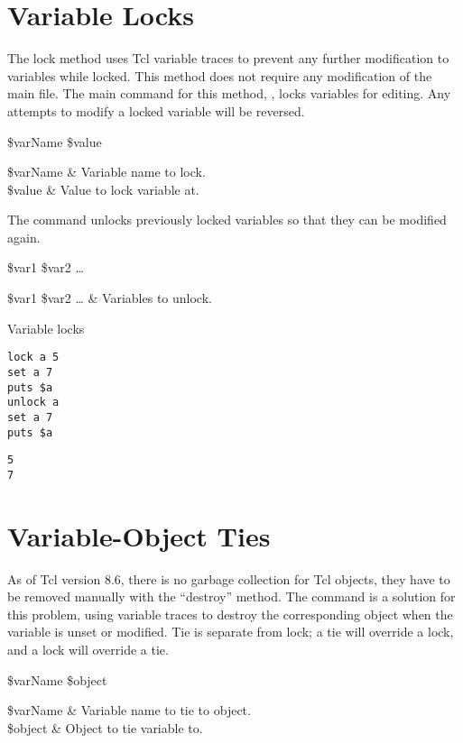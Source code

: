 \documentclass{article}
\renewcommand{\^}[1]{\textsuperscript{#1}}
\renewcommand{\_}[1]{\textsubscript{#1}}
\begin{document}
\section{Variable Locks}
The lock method uses Tcl variable traces to prevent any further modification to variables while locked. This method does not require any modification of the main file. The main command for this method, , locks variables for editing. Any attempts to modify a locked variable will be reversed. 

\begin{syntax}
 \$varName \$value
\end{syntax}
\begin{args}
\$varName & Variable name to lock. \\
\$value & Value to lock variable at.
\end{args}

The command  unlocks previously locked variables so that they can be modified again.

\begin{syntax}
 \$var1 \$var2 …
\end{syntax}
\begin{args}
\$var1 \$var2 … & Variables to unlock.
\end{args}

\begin{example}{Variable locks}
\begin{lstlisting}
lock a 5
set a 7
puts $a
unlock a
set a 7
puts $a
\end{lstlisting}
\tcblower
\begin{lstlisting}
5
7
\end{lstlisting}
\end{example}

\clearpage

\section{Variable-Object Ties}
As of Tcl version 8.6, there is no garbage collection for Tcl objects, they have to be removed manually with the ``destroy'' method. 
The command  is a solution for this problem, using variable traces to destroy the corresponding object when the variable is unset or modified. 
Tie is separate from lock; a tie will override a lock, and a lock will override a tie.
\begin{syntax}
 \$varName \$object
\end{syntax}
\begin{args}
\$varName & Variable name to tie to object. \\
\$object & Object to tie variable to.
\end{args}
\end{document}

